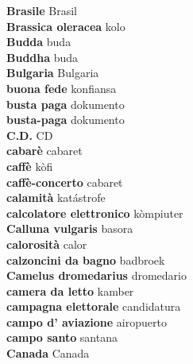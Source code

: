 \textbf{ Brasile  } Brasil \\
\textbf{ Brassica oleracea  } kolo \\
\textbf{ Budda  } buda \\
\textbf{ Buddha  } buda \\
\textbf{ Bulgaria  } Bulgaria \\
\textbf{ buona fede  } konfiansa \\
\textbf{ busta paga  } dokumento \\
\textbf{ busta-paga  } dokumento \\
\textbf{ C.D.  } CD \\
\textbf{ cabarè  } cabaret \\
\textbf{ caffè  } kòfi \\
\textbf{ caffè-concerto  } cabaret \\
\textbf{ calamità  } katástrofe \\
\textbf{ calcolatore elettronico  } kòmpiuter \\
\textbf{ Calluna vulgaris  } basora \\
\textbf{ calorosità  } calor \\
\textbf{ calzoncini da bagno  } badbroek \\
\textbf{ Camelus dromedarius  } dromedario \\
\textbf{ camera da letto  } kamber \\
\textbf{ campagna elettorale  } candidatura \\
\textbf{ campo d’ aviazione  } airopuerto \\
\textbf{ campo santo  } santana \\
\textbf{ Canada  } Canada \\
